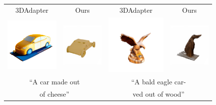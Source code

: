 \begin{figure}[h]
\setlength{\tabcolsep}{1pt}
\begin{tabular}{cccc}
    3DAdapter & Ours & 3DAdapter & Ours \\
    \includegraphics[width=0.25\linewidth]{images/rebuttal/3dadapter_comparison/car_cheese_3dadapter.png} &
    \includegraphics[width=0.25\linewidth]{images/rebuttal/3dadapter_comparison/cheese_car_000.png} &
    \includegraphics[width=0.25\linewidth]{images/rebuttal/3dadapter_comparison/eagle_3dadapter.png} &
    \includegraphics[width=0.25\linewidth]{images/rebuttal/3dadapter_comparison/wood_bald_eagle_000.png} \\
    \multicolumn{2}{c}{``A car made out} & \multicolumn{2}{c}{``A bald eagle car-} \\
    \multicolumn{2}{c}{of cheese''} & \multicolumn{2}{c}{ved out of wood''} 
\end{tabular}
\end{figure}